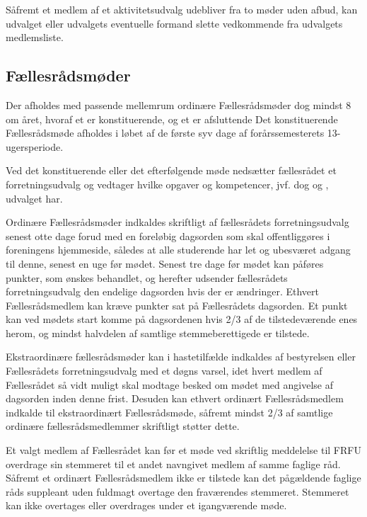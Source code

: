 \begin{list}
\item  Såfremt et medlem af et aktivitetsudvalg udebliver fra to møder uden afbud, kan udvalget eller udvalgets eventuelle formand slette vedkommende fra udvalgets medlemsliste.


\subsection{Fællesrådsmøder}
\label{S:kap:FRmoeder}
\item Der afholdes med passende mellemrum ordinære Fællesrådsmøder dog mindst 8 om året, hvoraf et er konstituerende, og et er afsluttende Det konstituerende Fællesrådsmøde afholdes i løbet af de første syv dage af forårssemesterets 13-ugersperiode.

\item  Ved det konstituerende eller det efterfølgende møde nedsætter fællesrådet et forretningsudvalg og vedtager hvilke opgaver og kompetencer, jvf. dog  og , udvalget har.

\item  \label{S:FRmoeder:indkaldelse} Ordinære Fællesrådsmøder indkaldes skriftligt af fællesrådets forretningsudvalg senest otte dage forud med en foreløbig dagsorden som skal offentliggøres i foreningens hjemmeside, således at alle studerende har let og ubesværet adgang til denne, senest en uge før mødet. Senest tre dage før mødet kan påføres punkter, som ønskes behandlet, og herefter udsender fællesrådets forretningsudvalg den endelige dagsorden hvis der er ændringer. Ethvert Fællesrådsmedlem kan kræve punkter sat på Fællesrådets dagsorden. Et punkt kan ved mødets start komme på dagsordenen hvis 2/3 af de tilstedeværende enes herom, og mindst halvdelen af samtlige stemmeberettigede er tilstede.                                     
                             
\item \label{S:FRmoeder:ekstra} Ekstraordinære fællesrådsmøder kan i hastetilfælde indkaldes af bestyrelsen eller Fællesrådets forretningsudvalg med et døgns varsel, idet hvert medlem af Fællesrådet så vidt muligt skal modtage besked om mødet med angivelse af dagsorden inden denne frist. Desuden kan ethvert ordinært Fællesrådsmedlem indkalde til ekstraordinært Fællesrådsmøde, såfremt mindst 2/3 af samtlige ordinære fællesrådsmedlemmer skriftligt støtter dette.

\item  Et valgt medlem af Fællesrådet kan før et møde ved skriftlig meddelelse til FRFU overdrage sin stemmeret til et andet navngivet medlem af samme faglige råd. Såfremt et ordinært Fællesrådsmedlem ikke er tilstede kan det pågældende faglige råds suppleant uden fuldmagt overtage den fraværendes stemmeret. Stemmeret kan ikke overtages eller overdrages under et igangværende møde.


\end{list}
